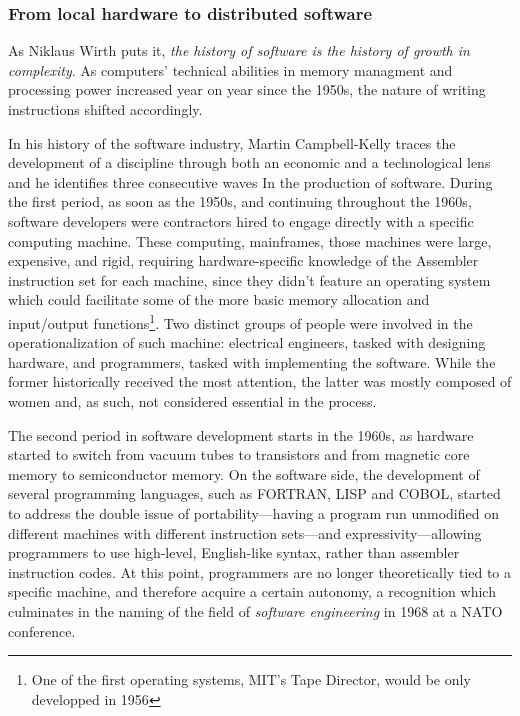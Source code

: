 \subsubsection{From local hardware to distributed software}

As Niklaus Wirth puts it, \emph{the history of software is the history of growth in complexity}\cite{wirth_brief_2008}. As computers' technical abilities in memory managment and processing power increased year on year since the 1950s, the nature of writing instructions shifted accordingly.

In his history of the software industry, Martin Campbell-Kelly traces the development of a discipline through both an economic and a technological lens and he identifies three consecutive waves In the production of software\cite{campbell-kelly_airline_2003}. During the first period, as soon as the 1950s, and continuing throughout the 1960s, software developers were contractors hired to engage directly with a specific computing machine. These computing, mainframes, those machines were large, expensive, and rigid, requiring hardware-specific knowledge of the Assembler instruction set for each machine, since they didn't feature an operating system which could facilitate some of the more basic memory allocation and input/output functions\footnote{One of the first operating systems, MIT's Tape Director, would be only developped in 1956\cite{ross_personal_1986}}. Two distinct groups of people were involved in the operationalization of such machine: electrical engineers, tasked with designing hardware, and programmers, tasked with implementing the software. While the former historically received the most attention\cite{ross_personal_1986}, the latter was mostly composed of women and, as such, not considered essential in the process\cite{light_when_1999}.

The second period in software development starts in the 1960s, as hardware started to switch from vacuum tubes to transistors and from magnetic core memory to semiconductor memory.  On the software side, the development of several programming languages, such as FORTRAN, LISP and COBOL, started to address the double issue of portability—having a program run unmodified on different machines with different instruction sets—and expressivity—allowing programmers to use high-level, English-like syntax, rather than assembler instruction codes. At this point, programmers are no longer theoretically tied to a specific machine, and therefore acquire a certain autonomy, a recognition which culminates in the naming of the field of \emph{software engineering} in 1968 at a NATO conference.

